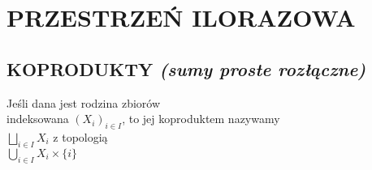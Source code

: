 \section{PRZESTRZEŃ ILORAZOWA}
\subsection{KOPRODUKTY \normalsize\emph{(sumy proste rozłączne)}}
\begin{center}\large
    Jeśli dana jest rodzina zbiorów \\indeksowana $(X_i)_{i\in I}$, to jej koproduktem nazywamy\smallskip\\
    $\bigsqcup\limits_{i\in I} X_i$
    z topologią\smallskip\\
    $\bigcup\limits_{i\in I}X_i\times \{i\}$
\end{center}